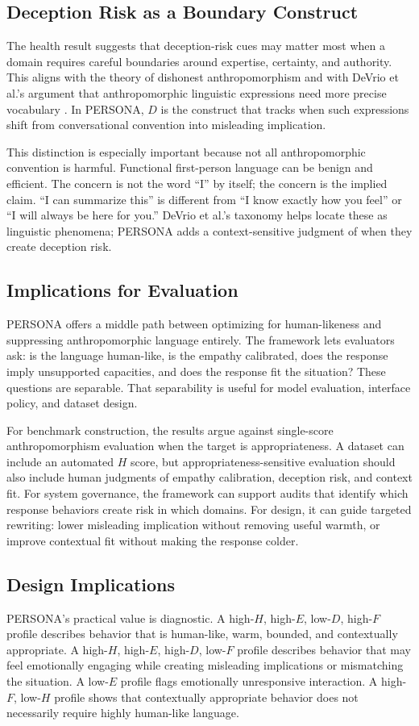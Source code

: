 \documentclass[manuscript,review,anonymous]{acmart}
\begin{document}
\subsection{Deception Risk as a Boundary Construct}
The health result suggests that deception-risk cues may matter most when a domain requires careful boundaries around expertise, certainty, and authority. This aligns with the theory of dishonest anthropomorphism \cite{Leong2019Dishonest} and with DeVrio et al.'s argument that anthropomorphic linguistic expressions need more precise vocabulary \cite{DeVrio2025Taxonomy}. In PERSONA, $D$ is the construct that tracks when such expressions shift from conversational convention into misleading implication.

This distinction is especially important because not all anthropomorphic convention is harmful. Functional first-person language can be benign and efficient. The concern is not the word ``I'' by itself; the concern is the implied claim. ``I can summarize this'' is different from ``I know exactly how you feel'' or ``I will always be here for you.'' DeVrio et al.'s taxonomy helps locate these as linguistic phenomena; PERSONA adds a context-sensitive judgment of when they create deception risk.

\subsection{Implications for Evaluation}
PERSONA offers a middle path between optimizing for human-likeness and suppressing anthropomorphic language entirely. The framework lets evaluators ask: is the language human-like, is the empathy calibrated, does the response imply unsupported capacities, and does the response fit the situation? These questions are separable. That separability is useful for model evaluation, interface policy, and dataset design.

For benchmark construction, the results argue against single-score anthropomorphism evaluation when the target is appropriateness. A dataset can include an automated $H$ score, but appropriateness-sensitive evaluation should also include human judgments of empathy calibration, deception risk, and context fit. For system governance, the framework can support audits that identify which response behaviors create risk in which domains. For design, it can guide targeted rewriting: lower misleading implication without removing useful warmth, or improve contextual fit without making the response colder.

\subsection{Design Implications}
PERSONA's practical value is diagnostic. A high-$H$, high-$E$, low-$D$, high-$F$ profile describes behavior that is human-like, warm, bounded, and contextually appropriate. A high-$H$, high-$E$, high-$D$, low-$F$ profile describes behavior that may feel emotionally engaging while creating misleading implications or mismatching the situation. A low-$E$ profile flags emotionally unresponsive interaction. A high-$F$, low-$H$ profile shows that contextually appropriate behavior does not necessarily require highly human-like language.
\end{document}
